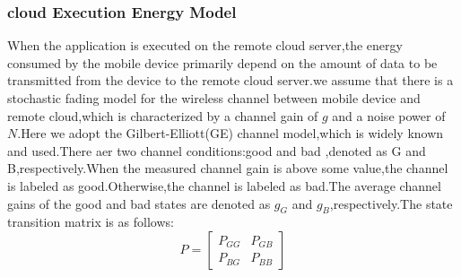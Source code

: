 \documentclass[review]{elsarticle}
\begin{document}
            \subsubsection{cloud Execution Energy Model}
             \noindent When the application is executed on the remote cloud server,the energy consumed by the mobile device primarily depend on the amount of data to be transmitted from the device to the remote cloud server.we assume that there is a stochastic fading model for the wireless channel between mobile device and remote cloud,which is characterized by a channel gain of \begin{math}g\end{math} and a noise power of \begin{math} N\end{math}.Here we adopt the Gilbert-Elliott(GE) channel model\citep{zafer2007minimum},which is widely known and used.There aer two channel conditions:good and bad ,denoted as G and B,respectively.When the measured channel gain is above some value,the channel is labeled as good.Otherwise,the channel is labeled as bad.The average channel gains of the good and bad states are denoted as  \begin{math}g_{G}\end{math} and  \begin{math}g_{B}\end{math},respectively.The state transition matrix is as follows: \\
             $$P=\begin{bmatrix}P_{GG} & P_{GB} \\P_{BG} &P_{BB} \end{bmatrix}$$
             
\end{document}
